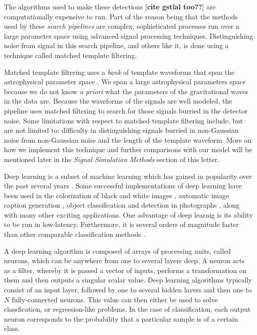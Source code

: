 \documentclass[%
 amsmath,amssymb,
 aps,
 twocolumn,
 prl,
 reprint,
floatfix,
]{revtex4-1}
\begin{document}
The algorithms used to make these detections \cite{0264-9381-33-21-215004} [\textbf{cite gstlal too??}] are computationally expensive to run. Part of the reason being that the methods used by these \textit{search pipelines} are complex, sophisticated processes run over a large parameter space using advanced signal processing techniques. Distinguishing noise from signal in this search pipeline, and others like it, is done using a technique called matched template filtering. 

Matched template filtering uses a \textit{bank} of template waveforms that span the astrophysical parameter space \cite{PhysRevD.44.3819, PhysRevD.49.1707, PhysRevD.53.6749, PhysRevD.60.022002, 0264-9381-23-18-002, PhysRevD.80.104014, PhysRevD.86.084017, PhysRevD.89.084041, PhysRevD.87.124003, 1307.4158, PhysRevD.89.024003, PhysRevD.93.124007}. We span a large astrophysical parameters space because we do not know \textit{a priori} what the parameters of the gravitational waves in the data are. Because the waveforms of the signals are well modeled, the pipeline uses matched filtering to search for those signals burried in the detector noise. Some limitations with respect to matched template filtering include, but are not limited to: difficulty in distinguishing signals burried in non-Gaussian noise from non-Gaussian noise and the length of the template waveform. More on how we implement this technique and further comparisons with our model will be mentioned later in the \textit{Signal Simulation Methods} section of this letter.

Deep learning is a subset of machine learning which has gained in popularity over the past several years \cite{NIPS2012_4824, 1406.2661, 1409.1556, 1412.7062, 1311.2901, 1409.4842}. Some successful implementations of deep learning have been used in the colorization of black and white images \cite{1603.08511}, automatic image caption generation \cite{1412.2306}, object classification and detection in photographs \cite{NIPS2012_4824}, along with many other exciting applications. One advantage of deep learnig is its ability to be run in low-latency. Furthermore, it is several orders of magnitude faster than other comparable classification methods \cite{726791}. 

A deep learning algorithm is composed of arrays of processing units, called neurons, which can be anywhere from one to several layers deep. A neuron acts as a filter, whereby it is passed a vector of inputs, performs a transformation on them and then outputs a singular scalar value. Deep learning algorithms typically consist of an input layer, followed by one to several hidden layers and then one to $N$ fully-connected neurons. This value can then either be used to solve classfication, or regression-like problems. In the case of classification, each output neuron corresponds to the probability that a particular sample is of a certain class. 
\end{document}
